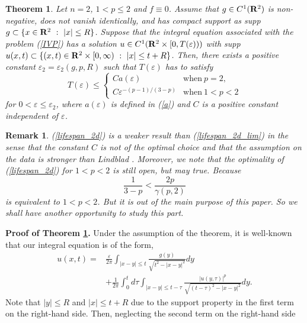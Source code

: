 \documentclass[a4paper,12pt]{article}
\numberwithin{equation}{section}
\def\R{{\bf R}}
\def\d{\displaystyle}
\def\e{{\varepsilon}}
\newtheorem{thm}{Theorem}[section]
\newtheorem{rem}{Remark}[section]
\begin{document}
\begin{thm}
\label{thm:2d}
Let $n=2$, $1<p\le2$ and $f\equiv0$.
Assume that $g\in C^1(\R^2)$ is non-negative, does not vanish identically, and 
has compact support as supp $g\subset\{x\in\R^2\ :\ |x|\le R\}$.
Suppose that the integral equation associated with the problem {\rm(\ref{IVP})} has a solution
$u\in C^1(\R^2\times[0,T(\e)))$ with supp $u(x,t)\subset\{(x,t)\in\R^2\times[0,\infty)\ :\ |x|\le t+R\}$.
Then, there exists a positive constant $\e_2
=\e_2(g,p,R)$ such that $T(\e)$ has to satisfy
\begin{equation}
\label{lifespan_2d}
T(\e)\le
\left\{
\begin{array}{ll}
C a(\e) & \mbox{when}\ p=2,\\
C\e^{-(p-1)/(3-p)} & \mbox{when}\ 1<p<2
\end{array}
\right.
\end{equation}
for $0<\e\le\e_2$, where $a(\e)$ is defined in (\ref{a})
and  $C$ is a positive constant independent of $\e$.
\end{thm}
\begin{rem}
(\ref{lifespan_2d}) is a weaker result than (\ref{lifespan_2d_lim})
in the sense that the constant $C$ is not of the optimal choice
and that the assumption on the data is stronger than Lindblad \cite{L90}.
Moreover, we note that the optimality of (\ref{lifespan_2d})
for $1<p<2$ is still open, but may true.
Because
\[
\frac{1}{3-p}<\frac{2p}{\gamma(p,2)}
\]
is equivalent to $1<p<2$.
But it is out of the main purpose of this paper.
So we shall have another opportunity to study this part. 
\end{rem}
\par\noindent
{\bf Proof of Theorem \ref{thm:2d}.}
Under the assumption of the theorem,
it is well-known that our integral equation is of the form,
\begin{equation}
\label{rep_2d}
\begin{array}{ll}
u(x,t)=
&\d\frac{\e}{2\pi}\int_{|x-y|\le t}\frac{g(y)}{\sqrt{t^2-|x-y|^2}}dy\\
&\d+\frac{1}{2\pi}\int_0^td\tau
\int_{|x-y|\le t-\tau}\frac{|u(y,\tau)|^p}{\sqrt{(t-\tau)^2-|x-y|^2}}dy.
\end{array}
\end{equation}
Note that $|y|\le R$ and $|x|\le t+R$ due to the support property
in the first term on the right-hand side.
Then, neglecting the second term on the right-hand side
\end{document}
